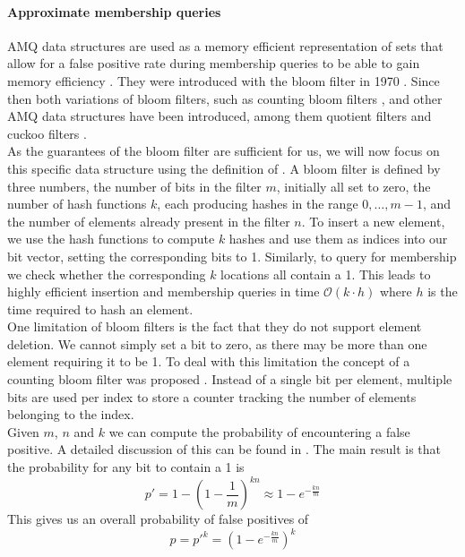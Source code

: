 \paragraph{Approximate membership queries}
AMQ data structures are used as a memory efficient representation of sets that allow for a false positive rate during membership queries to be able to gain memory efficiency \cite{bender2011don}. They were introduced with the bloom filter in 1970 \cite{bloom1970space}. Since then both variations of bloom filters, such as counting bloom filters \cite{fan2000summary}, and other AMQ data structures have been introduced, among them quotient filters \cite{bender2011don} and cuckoo filters \cite{fan2014cuckoo}. \\
As the guarantees of the bloom filter are sufficient for us, we will now focus on this specific data structure using the definition of \cite{bloom1970space}. A bloom filter is defined by three numbers, the number of bits in the filter $m$, initially all set to zero, the number of hash functions $k$, each producing hashes in the range $0, \ldots, m-1$, and the number of elements already present in the filter $n$. To insert a new element, we use the hash functions to compute $k$ hashes and use them as indices into our bit vector, setting the corresponding bits to 1. Similarly, to query for membership we check whether the corresponding $k$ locations all contain a 1. This leads to highly efficient insertion and membership queries in time $\mathcal{O}(k \cdot h)$ where $h$ is the time required to hash an element. \\
One limitation of bloom filters is the fact that they do not support element deletion. We cannot simply set a bit to zero, as there may be more than one element requiring it to be 1. To deal with this limitation the concept of a counting bloom filter was proposed \cite{fan2000summary}. Instead of a single bit per element, multiple bits are used per index to store a counter tracking the number of elements belonging to the index. \\
Given $m$, $n$ and $k$ we can compute the probability of encountering a false positive. A detailed discussion of this can be found in \cite{broder2004network}. The main result is that the probability for any bit to contain a 1 is
\[
	p' = 1 - \left( 1 - \frac{1}{m} \right)^{kn} \approx 1 - e^{-\frac{kn}{m}}
\]
This gives us an overall probability of false positives of
\[
	p = p'^k = \left(1 - e^{-\frac{kn}{m}}\right)^k
\]
